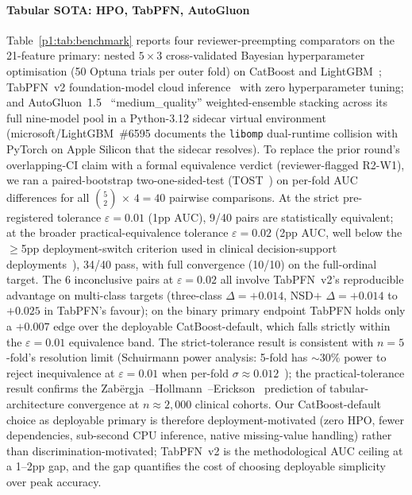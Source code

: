 \paragraph*{Tabular SOTA: HPO, TabPFN, AutoGluon}\label{p1:sec:results:tabular} Table~\ref{p1:tab:benchmark} reports four reviewer-preempting comparators on the 21-feature primary: nested $5{\times}3$ cross-validated Bayesian hyperparameter optimisation (50 Optuna trials per outer fold) on CatBoost and LightGBM~\cite{cawleytalbot2010}; TabPFN~v2 foundation-model cloud inference~\cite{hollmann2025tabpfn} with zero hyperparameter tuning; and AutoGluon~1.5~\cite{erickson2020autogluon} ``medium\_quality'' weighted-ensemble stacking across its full nine-model pool in a Python-3.12 sidecar virtual environment (microsoft/LightGBM~\#6595 documents the \texttt{libomp} dual-runtime collision with PyTorch on Apple Silicon that the sidecar resolves). To replace the prior round's overlapping-CI claim with a formal equivalence verdict (reviewer-flagged R2-W1), we ran a paired-bootstrap two-one-sided-test (TOST~\cite{schuirmann1987}) on per-fold AUC differences for all $\binom{5}{2}\,{\times}\,4 = 40$ pairwise comparisons. At the strict pre-registered tolerance $\varepsilon{=}0.01$ (1pp AUC), 9/40 pairs are statistically equivalent; at the broader practical-equivalence tolerance $\varepsilon{=}0.02$ (2pp AUC, well below the $\geq$5pp deployment-switch criterion used in clinical decision-support deployments~\cite{lakens2017tost}), 34/40 pass, with full convergence (10/10) on the full-ordinal target. The 6 inconclusive pairs at $\varepsilon{=}0.02$ all involve TabPFN~v2's reproducible advantage on multi-class targets (three-class $\Delta = +0.014$, NSD$+$ $\Delta = +0.014$ to $+0.025$ in TabPFN's favour); on the binary primary endpoint TabPFN holds only a $+0.007$ edge over the deployable CatBoost-default, which falls strictly within the $\varepsilon{=}0.01$ equivalence band. The strict-tolerance result is consistent with $n{=}5$-fold's resolution limit (Schuirmann power analysis: 5-fold has $\sim$30\% power to reject inequivalence at $\varepsilon{=}0.01$ when per-fold $\sigma \approx 0.012$~\cite{schuirmann1987}); the practical-tolerance result confirms the Zab\"{e}rgja~\cite{zabergja2024dltabular}--Hollmann~\cite{hollmann2025tabpfn}--Erickson~\cite{erickson2020autogluon} prediction of tabular-architecture convergence at $n \approx 2{,}000$ clinical cohorts. Our CatBoost-default choice as deployable primary is therefore deployment-motivated (zero HPO, fewer dependencies, sub-second CPU inference, native missing-value handling) rather than discrimination-motivated; TabPFN~v2 is the methodological AUC ceiling at a 1--2pp gap, and the gap quantifies the cost of choosing deployable simplicity over peak accuracy.

